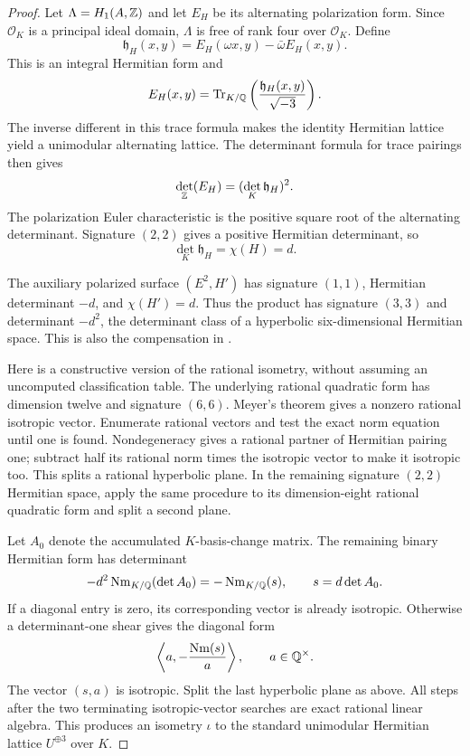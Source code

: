 \begin{proof}
Let $\Lambda=H_1(A,\mathbb Z)$ and let $E_H$ be its alternating polarization form. Since $\mathcal O_K$ is a principal ideal domain, $\Lambda$ is free of rank four over $\mathcal O_K$. Define
\[
\mathfrak h_H(x,y)=E_H(\omega x,y)-\bar\omega E_H(x,y).
\]
This is an integral Hermitian form and
\[
E_H(x,y)=\operatorname{Tr}_{K/\mathbb Q}\left(\frac{\mathfrak h_H(x,y)}{\sqrt{-3}}\right).
\]
The inverse different in this trace formula makes the identity Hermitian lattice yield a unimodular alternating lattice. The determinant formula for trace pairings then gives
\[
\det_{\mathbb Z}(E_H)=(\det_K\mathfrak h_H)^2.
\]
The polarization Euler characteristic is the positive square root of the alternating determinant. Signature $(2,2)$ gives a positive Hermitian determinant, so
\[
\det_K\mathfrak h_H=\chi(H)=d.
\]

The auxiliary polarized surface $(E^2,H')$ has signature $(1,1)$, Hermitian determinant $-d$, and $\chi(H')=d$. Thus the product has signature $(3,3)$ and determinant $-d^2$, the determinant class of a hyperbolic six-dimensional Hermitian space. This is also the compensation in \cite[\S7 and Proposition 10]{Schoen1998}.

Here is a constructive version of the rational isometry, without assuming an uncomputed classification table. The underlying rational quadratic form has dimension twelve and signature $(6,6)$. Meyer's theorem \cite[Corollary 3.3.4]{PetersSterk} gives a nonzero rational isotropic vector. Enumerate rational vectors and test the exact norm equation until one is found. Nondegeneracy gives a rational partner of Hermitian pairing one; subtract half its rational norm times the isotropic vector to make it isotropic too. This splits a rational hyperbolic plane. In the remaining signature $(2,2)$ Hermitian space, apply the same procedure to its dimension-eight rational quadratic form and split a second plane.

Let $A_0$ denote the accumulated $K$-basis-change matrix. The remaining binary Hermitian form has determinant
\[
-d^2\operatorname{Nm}_{K/\mathbb Q}(\det A_0)=-\operatorname{Nm}_{K/\mathbb Q}(s),
\qquad s=d\det A_0.
\]
If a diagonal entry is zero, its corresponding vector is already isotropic. Otherwise a determinant-one shear gives the diagonal form
\[
\left\langle a,-\frac{\operatorname{Nm}(s)}a\right\rangle,
\qquad a\in\mathbb Q^\times.
\]
The vector $(s,a)$ is isotropic. Split the last hyperbolic plane as above. All steps after the two terminating isotropic-vector searches are exact rational linear algebra. This produces an isometry $\iota$ to the standard unimodular Hermitian lattice $U^{\oplus3}$ over $K$.


\end{proof}
